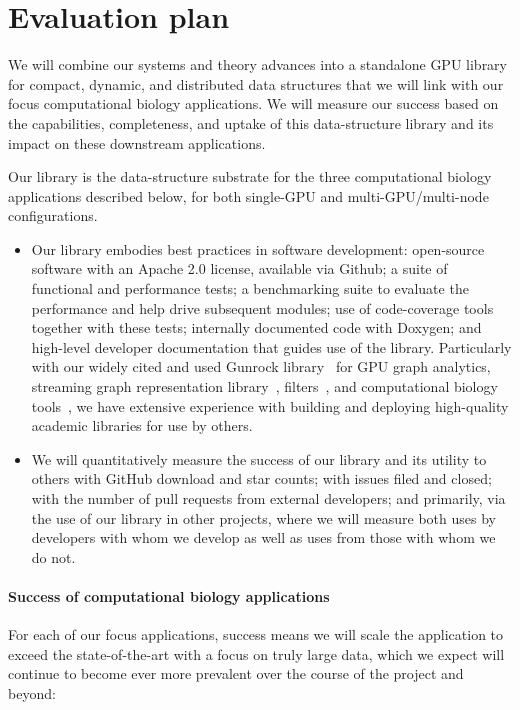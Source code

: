 
\section{Evaluation plan}

 We will combine our systems and theory advances into a standalone GPU library for compact, dynamic, and distributed data structures that we will link with our focus computational biology applications. We will measure our success based on the capabilities, completeness, and uptake of this data-structure library and its impact on these downstream applications.

Our library is the data-structure substrate for the three computational biology applications described below, for both single-GPU and multi-GPU/multi-node configurations.

\begin{itemize}%
  \item Our library embodies best practices in software development: open-source software with an Apache 2.0 license, available via Github; a suite of functional and performance tests; a benchmarking suite to evaluate the performance and help drive subsequent modules; use of code-coverage tools together with these tests; internally documented code with Doxygen; and high-level developer documentation that guides use of the library. Particularly with our widely cited and used Gunrock library~\cite{Wang:2017:GGG} for GPU graph analytics, streaming graph representation library~\cite{pandey2021terrace}, filters~\cite{PandeyBJP17,PandeyCDBFJ21}, and computational biology tools~\cite{PandeyBeJo18,PandeyBeJo17b,PandeyAlBe18,pandey2021variantstore}, we have extensive experience with building and deploying high-quality academic libraries for use by others.
  \item We will quantitatively measure the success of our library and its utility to others with GitHub download and star counts; with issues filed and closed; with the number of pull requests from external developers; and primarily, via the use of our library in other projects, where we will measure both uses by developers with whom we develop as well as uses from those with whom we do not.
\end{itemize}

\paragraph{Success of computational biology applications}
For each of our focus applications, success means we will scale the application to exceed the state-of-the-art with a focus on truly large data, which we expect will continue to become ever more prevalent over the course of the project and beyond:

